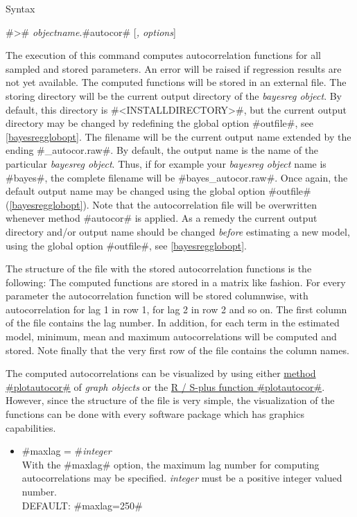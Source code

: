 \begin{stanza}{Syntax}

#># {\em objectname}.#autocor# [{\em , options}]

The execution of this command computes autocorrelation functions
for all sampled and stored parameters. An error
 will be raised
if regression results are not yet available. The computed
functions will be stored in an external file. The storing
directory will be the current output directory of the {\em
bayesreg object}. By default, this directory is
#<INSTALLDIRECTORY>\output#, but the current output
directory may be changed by redefining the global option
#outfile#, see \autoref{bayesregglobopt}. The filename will be
the current output name extended by the ending #_autocor.raw#. By
default, the output name is the name of the particular {\em
bayesreg object}. Thus, if for example your {\em bayesreg object}
 name is #bayes#, the complete
filename will be #bayes_autocor.raw#. Once again, the  default
output name may be changed using the global option #outfile#
(\autoref{bayesregglobopt}). Note that the autocorrelation file
will be overwritten whenever method #autocor# is applied. As a
remedy the current output directory and/or output name should be
changed {\em before} estimating a new model, using the global
option #outfile#, see \autoref{bayesregglobopt}.

The structure of the file with the stored autocorrelation
functions is the following: The computed functions are stored in a
matrix like fashion. For every parameter the autocorrelation
function will be stored columnwise, with autocorrelation for lag 1
in row 1, for lag 2 in row 2 and so on. The first column of the
file contains the lag number. In addition, for each term in the
estimated model, minimum, mean and maximum autocorrelations will
be computed and stored. Note finally that the very first row of
the file contains the column names.

The computed autocorrelations can be visualized by using either
\hyperref[graphplotautocor]{method #plotautocor#} of {\em graph
objects} or the \hyperref[splusplotautocor]{R / S-plus function
#plotautocor#}. However, since the structure of the file is very
simple, the visualization of the functions can be done with every
software package which has graphics capabilities.
\end{stanza}


\begin{itemize}
\item  #maxlag = #{\em integer } \\
With the #maxlag# option, the maximum lag number for computing
autocorrelations may be specified.
{\em integer} must be a positive integer valued number. \\
DEFAULT: #maxlag=250#
\end{itemize}

